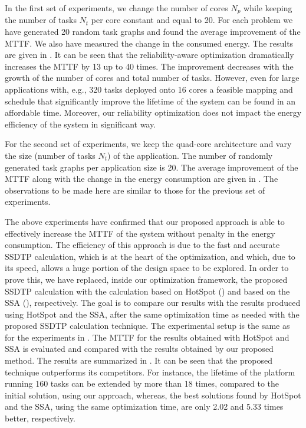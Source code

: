 In the first set of experiments, we change the number of cores $N_p$ while keeping the number of tasks $N_t$ per core constant and equal to 20. For each problem we have generated 20 random task graphs and found the average improvement of the MTTF. We also have measured the change in the consumed energy. The results are given in . It can be seen that the reliability-aware optimization dramatically increases the MTTF by 13 up to 40 times. The improvement decreases with the growth of the number of cores and total number of tasks. However, even for large applications with, e.g., 320 tasks deployed onto 16 cores a feasible mapping and schedule that significantly improve the lifetime of the system can be found in an affordable time. Moreover, our reliability optimization does not impact the energy efficiency of the system in  significant way.

For the second set of experiments, we keep the quad-core architecture and vary the size (number of tasks $N_t$) of the application. The number of randomly generated task graphs per application size is 20. The average improvement of the MTTF along with the change in the energy consumption are given in . The observations to be made here are similar to those for the previous set of experiments.

The above experiments have confirmed that our proposed approach is able to effectively increase the MTTF of the system without  penalty in the energy consumption. The efficiency of this approach is due to the fast and accurate SSDTP calculation, which is at the heart of the optimization, and which, due to its speed, allows a huge portion of the design space to be explored. In order to prove this, we have replaced, inside our optimization framework, the proposed SSDTP calculation with the calculation based on HotSpot () and based on the SSA (), respectively. The goal is to compare our results with the results produced using HotSpot and the SSA, after the same optimization time as needed with the proposed SSDTP calculation technique. The experimental setup is the same as for the experiments in . The MTTF for the results obtained with HotSpot and SSA is evaluated and compared with the results obtained by our proposed method. The results are summarized in . It can be seen that the proposed technique outperforms its competitors. For instance, the lifetime of the platform running 160 tasks can be extended by more than 18 times, compared to the initial solution, using our approach, whereas, the best solutions found by HotSpot and the SSA, using the same optimization time, are only 2.02 and 5.33 times better, respectively.


